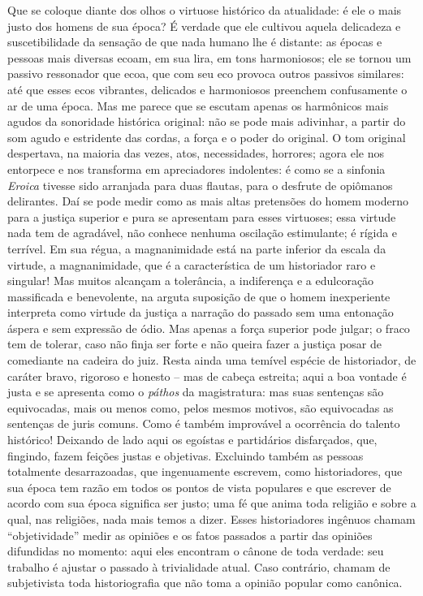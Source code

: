 Que se coloque diante dos olhos o virtuose histórico da atualidade: é
ele o mais justo dos homens de sua época? É verdade que ele cultivou
aquela delicadeza e suscetibilidade da sensação de que nada humano lhe é
distante: as épocas e pessoas mais diversas ecoam, em sua lira, em tons
harmoniosos; ele se tornou um passivo ressonador que ecoa, que com seu
eco provoca outros passivos similares: até que esses ecos vibrantes,
delicados e harmoniosos preenchem confusamente o ar de uma época. Mas me
parece que se escutam apenas os harmônicos mais agudos da sonoridade
histórica original: não se pode mais adivinhar, a partir do som agudo e
estridente das cordas, a força e o poder do original. O tom original
despertava, na maioria das vezes, atos, necessidades, horrores; agora
ele nos entorpece e nos transforma em apreciadores indolentes: é como se
a sinfonia \emph{Eroica} tivesse sido arranjada para duas flautas, para
o desfrute de opiômanos delirantes. Daí se pode medir como as mais altas
pretensões do homem moderno para a justiça superior e pura se apresentam
para esses virtuoses; essa virtude nada tem de agradável, não conhece
nenhuma oscilação estimulante; é rígida e terrível. Em sua régua, a
magnanimidade está na parte inferior da escala da virtude, a
magnanimidade, que é a característica de um historiador raro e singular!
Mas muitos alcançam a tolerância, a indiferença e a edulcoração
massificada e benevolente, na arguta suposição de que o homem
inexperiente interpreta como virtude da justiça a narração do passado
sem uma entonação áspera e sem expressão de ódio. Mas apenas a força
superior pode julgar; o fraco tem de tolerar, caso não finja ser forte e
não queira fazer a justiça posar de comediante na cadeira do juiz. Resta
ainda uma temível espécie de historiador, de caráter bravo, rigoroso e
honesto -- mas de cabeça estreita; aqui a boa vontade é justa e se
apresenta como o \emph{páthos} da magistratura: mas suas sentenças são
equivocadas, mais ou menos como, pelos mesmos motivos, são equivocadas
as sentenças de juris comuns. Como é também improvável a ocorrência do
talento histórico! Deixando de lado aqui os egoístas e partidários
disfarçados, que, fingindo, fazem feições justas e objetivas. Excluindo
também as pessoas totalmente desarrazoadas, que ingenuamente escrevem,
como historiadores, que sua época tem razão em todos os pontos de vista
populares e que escrever de acordo com sua época significa ser justo;
uma fé que anima toda religião e sobre a qual, nas religiões, nada mais
temos a dizer. Esses historiadores ingênuos chamam ``objetividade''
medir as opiniões e os fatos passados a partir das opiniões difundidas
no momento: aqui eles encontram o cânone de toda verdade: seu trabalho é
ajustar o passado à trivialidade atual. Caso contrário, chamam de
subjetivista toda historiografia que não toma a opinião popular como
canônica.

